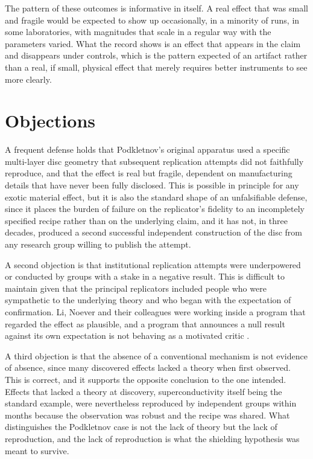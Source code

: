 \documentclass[11pt]{article}
\begin{document}
The pattern of these outcomes is informative in itself. A real effect that was small and fragile would be expected to show up occasionally, in a minority of runs, in some laboratories, with magnitudes that scale in a regular way with the parameters varied. What the record shows is an effect that appears in the claim and disappears under controls, which is the pattern expected of an artifact rather than a real, if small, physical effect that merely requires better instruments to see more clearly.

\section{Objections}

A frequent defense holds that Podkletnov's original apparatus used a specific multi-layer disc geometry that subsequent replication attempts did not faithfully reproduce, and that the effect is real but fragile, dependent on manufacturing details that have never been fully disclosed. This is possible in principle for any exotic material effect, but it is also the standard shape of an unfalsifiable defense, since it places the burden of failure on the replicator's fidelity to an incompletely specified recipe rather than on the underlying claim, and it has not, in three decades, produced a second successful independent construction of the disc from any research group willing to publish the attempt.

A second objection is that institutional replication attempts were underpowered or conducted by groups with a stake in a negative result. This is difficult to maintain given that the principal replicators included people who were sympathetic to the underlying theory and who began with the expectation of confirmation. Li, Noever and their colleagues were working inside a program that regarded the effect as plausible, and a program that announces a null result against its own expectation is not behaving as a motivated critic \cite{Li1997}.

A third objection is that the absence of a conventional mechanism is not evidence of absence, since many discovered effects lacked a theory when first observed. This is correct, and it supports the opposite conclusion to the one intended. Effects that lacked a theory at discovery, superconductivity itself being the standard example, were nevertheless reproduced by independent groups within months because the observation was robust and the recipe was shared. What distinguishes the Podkletnov case is not the lack of theory but the lack of reproduction, and the lack of reproduction is what the shielding hypothesis was meant to survive.
\end{document}
